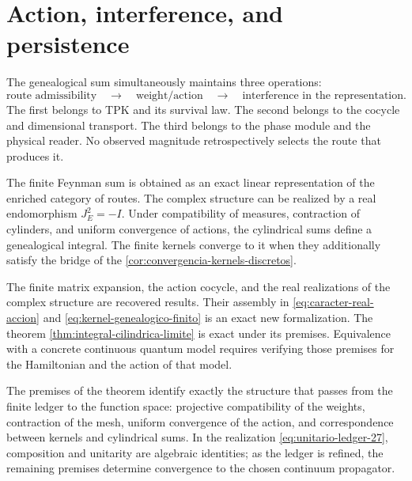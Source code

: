 \section{Action, interference, and persistence}

The genealogical sum simultaneously maintains three operations:
\[
 \text{route admissibility}
 \quad\longrightarrow\quad
 \text{weight/action}
 \quad\longrightarrow\quad
 \text{interference in the representation}.
\]
The first belongs to TPK and its survival law. The second belongs
to the cocycle and dimensional transport. The third belongs to the phase
module and the physical reader. No observed magnitude retrospectively
selects the route that produces it.

\begin{resultbox}
The finite Feynman sum is obtained as an exact linear representation of the
enriched category of routes. The complex structure can be realized by a real
endomorphism \(J_E^2=-I\). Under compatibility of measures, contraction of
cylinders, and uniform convergence of actions, the cylindrical sums define
a genealogical integral. The finite kernels converge to it when they
additionally satisfy the bridge of the
\cref{cor:convergencia-kernels-discretos}.
\end{resultbox}

\begin{statusbox}
The finite matrix expansion, the action cocycle, and the real realizations
of the complex structure are recovered results. Their assembly in
\eqref{eq:caracter-real-accion} and \eqref{eq:kernel-genealogico-finito} is an
exact new formalization. The theorem \ref{thm:integral-cilindrica-limite} is
exact under its premises. Equivalence with a concrete continuous quantum model
requires verifying those premises for the Hamiltonian and the action of
that model.
\end{statusbox}

The premises of the theorem identify exactly the structure that passes from the finite ledger to the function space: projective compatibility of the weights, contraction of the mesh, uniform convergence of the action, and correspondence between kernels and cylindrical sums. In the realization \eqref{eq:unitario-ledger-27}, composition and unitarity are algebraic identities; as the ledger is refined, the remaining premises determine convergence to the chosen continuum propagator.

